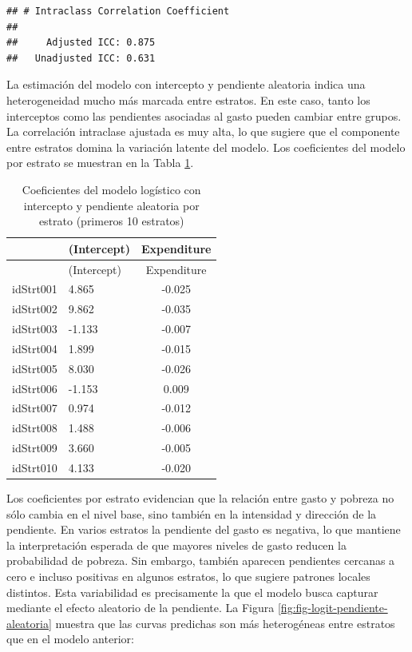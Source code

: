 \documentclass[
  spanish,
  12pt,
]{book}
\newenvironment{Shaded}{\begin{snugshade}}{\end{snugshade}}
\newcommand{\DataTypeTok}[1]{\textcolor[rgb]{0.13,0.29,0.53}{#1}}
\newcommand{\DecValTok}[1]{\textcolor[rgb]{0.00,0.00,0.81}{#1}}
\newcommand{\FunctionTok}[1]{\textcolor[rgb]{0.13,0.29,0.53}{\textbf{#1}}}
\newcommand{\NormalTok}[1]{#1}
\newcommand{\SpecialCharTok}[1]{\textcolor[rgb]{0.81,0.36,0.00}{\textbf{#1}}}
\begin{document}
\begin{verbatim}
## # Intraclass Correlation Coefficient
## 
##     Adjusted ICC: 0.875
##   Unadjusted ICC: 0.631
\end{verbatim}

La estimación del modelo con intercepto y pendiente aleatoria indica una heterogeneidad mucho más marcada entre estratos. En este caso, tanto los interceptos como las pendientes asociadas al gasto pueden cambiar entre grupos. La correlación intraclase ajustada es muy alta, lo que sugiere que el componente entre estratos domina la variación latente del modelo. Los coeficientes del modelo por estrato se muestran en la Tabla \ref{tab:tab-coef-logit-pendiente}.

\begin{Shaded}
\end{Shaded}

\begin{longtable}[]{@{}llc@{}}
\caption{\label{tab:tab-coef-logit-pendiente}Coeficientes del modelo logístico con intercepto y pendiente aleatoria por estrato (primeros 10 estratos)}\tabularnewline
\toprule\noalign{}
& (Intercept) & Expenditure \\
\midrule\noalign{}
\endfirsthead
\toprule\noalign{}
& (Intercept) & Expenditure \\
\midrule\noalign{}
\endhead
\bottomrule\noalign{}
\endlastfoot
idStrt001 & 4.865 & -0.025 \\
idStrt002 & 9.862 & -0.035 \\
idStrt003 & -1.133 & -0.007 \\
idStrt004 & 1.899 & -0.015 \\
idStrt005 & 8.030 & -0.026 \\
idStrt006 & -1.153 & 0.009 \\
idStrt007 & 0.974 & -0.012 \\
idStrt008 & 1.488 & -0.006 \\
idStrt009 & 3.660 & -0.005 \\
idStrt010 & 4.133 & -0.020 \\
\end{longtable}

Los coeficientes por estrato evidencian que la relación entre gasto y pobreza no sólo cambia en el nivel base, sino también en la intensidad y dirección de la pendiente. En varios estratos la pendiente del gasto es negativa, lo que mantiene la interpretación esperada de que mayores niveles de gasto reducen la probabilidad de pobreza. Sin embargo, también aparecen pendientes cercanas a cero e incluso positivas en algunos estratos, lo que sugiere patrones locales distintos. Esta variabilidad es precisamente la que el modelo busca capturar mediante el efecto aleatorio de la pendiente. La Figura \ref{fig:fig-logit-pendiente-aleatoria} muestra que las curvas predichas son más heterogéneas entre estratos que en el modelo anterior:
\end{document}
